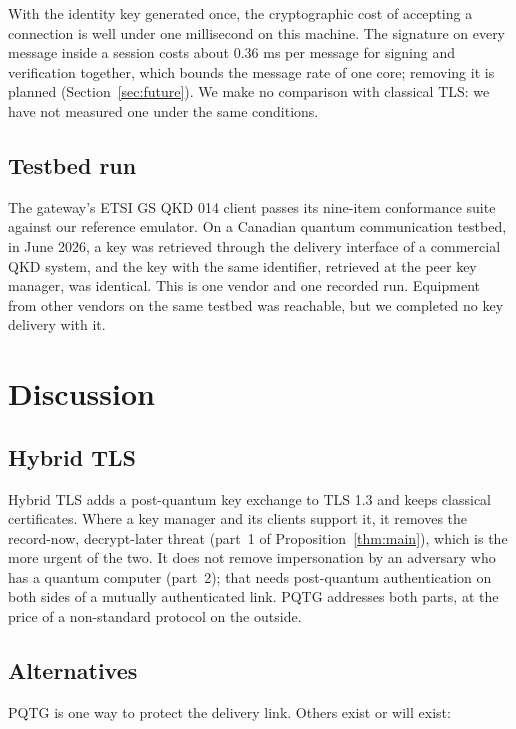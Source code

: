 \documentclass[11pt,letterpaper]{article}
\begin{document}
With the identity key generated once, the cryptographic cost of accepting a connection is well under one millisecond on this machine. The signature on every message inside a session costs about 0.36 ms per message for signing and verification together, which bounds the message rate of one core; removing it is planned (Section~\ref{sec:future}). We make no comparison with classical TLS: we have not measured one under the same conditions.

\subsection{Testbed run}

The gateway's ETSI GS QKD 014 client passes its nine-item conformance suite against our reference emulator. On a Canadian quantum communication testbed, in June 2026, a key was retrieved through the delivery interface of a commercial QKD system, and the key with the same identifier, retrieved at the peer key manager, was identical. This is one vendor and one recorded run. Equipment from other vendors on the same testbed was reachable, but we completed no key delivery with it.

\section{Discussion}

\subsection{Hybrid TLS}

Hybrid TLS adds a post-quantum key exchange to TLS 1.3 and keeps classical certificates. Where a key manager and its clients support it, it removes the record-now, decrypt-later threat (part~1 of Proposition~\ref{thm:main}), which is the more urgent of the two. It does not remove impersonation by an adversary who has a quantum computer (part~2); that needs post-quantum authentication on both sides of a mutually authenticated link. PQTG addresses both parts, at the price of a non-standard protocol on the outside.

\subsection{Alternatives}

PQTG is one way to protect the delivery link. Others exist or will exist:
\end{document}
